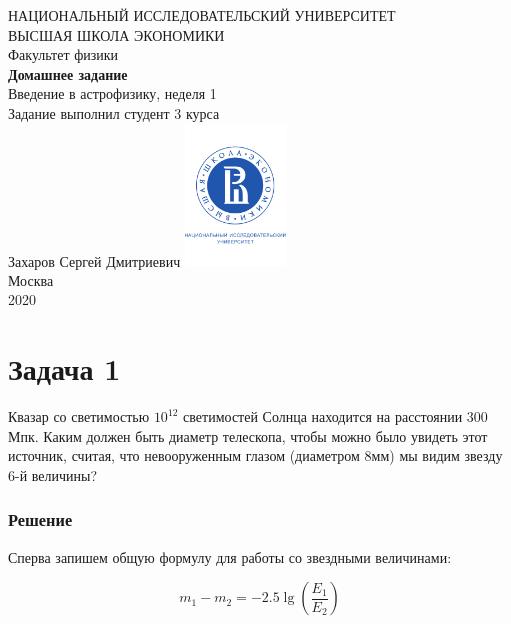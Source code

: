 \documentclass[a4paper, 12pt]{article}
\begin{document}
	\begin{titlepage}
		\begin{center}
			$$$$
			$$$$
			$$$$
			$$$$
			{\Large{НАЦИОНАЛЬНЫЙ ИССЛЕДОВАТЕЛЬСКИЙ УНИВЕРСИТЕТ}}\\
			\vspace{0.1cm}
			{\Large{ВЫСШАЯ ШКОЛА ЭКОНОМИКИ}}\\
			\vspace{0.25cm}
			{\large{Факультет физики}}\\
			\vspace{5.5cm}
			{\Huge\textbf{{Домашнее задание}}}\\%
			\vspace{1cm}
			{\LARGE{Введение в астрофизику, неделя 1}}\\%
			\vspace{2cm}
			{Задание выполнил студент 3 курса}\\
			{Захаров Сергей Дмитриевич}
			\vfill
			\includegraphics[width = 0.2\textwidth]{HSElogo}\\
			\vfill
			Москва\\
			2020
		\end{center}
	\end{titlepage}

\section*{Задача 1}

Квазар со светимостью $10^{12}$ светимостей Солнца находится на расстоянии 300 Мпк. Каким должен быть диаметр телескопа, чтобы можно было увидеть этот источник, считая, что невооруженным глазом (диаметром 8мм) мы видим звезду 6-й величины?

\subsubsection*{Решение}

Сперва запишем общую формулу для работы со звездными величинами:

\begin{equation}
	m_1 - m_2 = -2.5 \lg \left(\frac{E_1}{E_2}\right)
	\label{eq:mag_main}
\end{equation}
\end{document}
